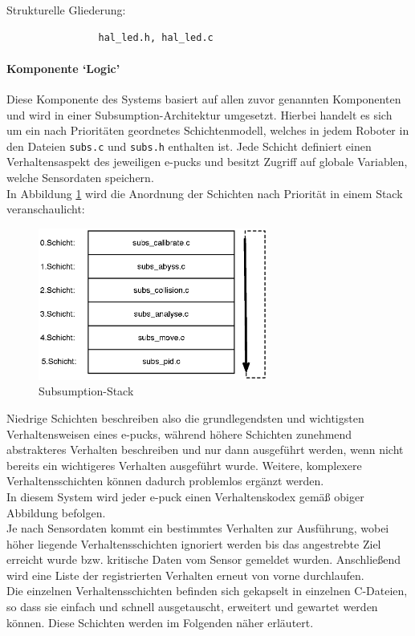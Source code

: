 \documentclass[10pt,a4paper]{article}
\begin{document}
			Strukturelle Gliederung:
				\begin{verbatim}  
				hal_led.h, hal_led.c
				\end{verbatim}

		\paragraph*{Komponente `Logic'}
			Diese Komponente des Systems basiert auf allen zuvor genannten Komponenten und wird in einer Subsumption-Architektur umgesetzt. Hierbei
			handelt es sich um ein nach Prioritäten geordnetes Schichtenmodell, welches in jedem Roboter in den Dateien \texttt{subs.c} und 
			\texttt{subs.h} enthalten ist. Jede Schicht definiert einen Verhaltensaspekt des jeweiligen e-pucks und besitzt Zugriff auf globale Variablen,
			welche Sensordaten speichern. \\
            In Abbildung \ref{fig:subsumption} wird die Anordnung der Schichten nach Priorität in einem Stack veranschaulicht: \\ 

			\begin{figure}[h]
				\centering
				\includegraphics[height=5cm]{images/subsumption.eps}
				\caption{Subsumption-Stack}		
				\label{fig:subsumption}	
			\end{figure}

			Niedrige Schichten beschreiben also die grundlegendsten und wichtigsten Verhaltensweisen eines e-pucks, während höhere Schichten zunehmend
			abstrakteres Verhalten beschreiben und nur dann ausgeführt werden, wenn nicht bereits ein wichtigeres Verhalten ausgeführt wurde. Weitere,
			komplexere Verhaltensschichten können dadurch problemlos ergänzt werden.\\ 
			In diesem System wird jeder e-puck einen Verhaltenskodex gemäß obiger Abbildung befolgen. \\
			Je nach Sensordaten kommt ein bestimmtes Verhalten zur Ausführung, wobei höher liegende Verhaltensschichten ignoriert werden bis das
			angestrebte Ziel erreicht wurde bzw. kritische Daten vom Sensor gemeldet wurden. Anschließend wird eine Liste der registrierten Verhalten
			erneut von vorne durchlaufen. \\
			Die einzelnen Verhaltensschichten befinden sich gekapselt in einzelnen C-Dateien, so dass sie einfach und schnell ausgetauscht, erweitert und
			gewartet werden können. Diese Schichten werden im Folgenden näher erläutert. \\
\end{document}

